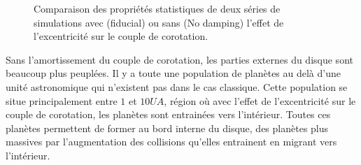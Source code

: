 \begin{figure}[htbp]
\centering
{}\hfill
{}
\caption[Effet de l'amortissement du couple de corotation sur les propriétés statistiques des planètes formées.]{Comparaison des
propriétés statistiques de deux séries de simulations avec (fiducial) ou sans (No damping) l'effet de l'excentricité sur le
couple
de corotation.}\label{fig:HSE_no_damping}
\end{figure}

Sans l'amortissement du couple de corotation, les parties externes du disque sont beaucoup plus peuplées. Il y a toute une
population de planètes au delà d'une unité astronomique qui n'existent pas dans le cas classique. Cette population se situe
principalement entre $1$ et $10\unit{UA}$, région où avec l'effet de l'excentricité sur le couple de corotation, les planètes
sont entrainées vers l'intérieur. Toutes ces planètes permettent de former au bord interne du disque, des planètes plus massives
par l'augmentation des collisions qu'elles entrainent en migrant vers l'intérieur. 

